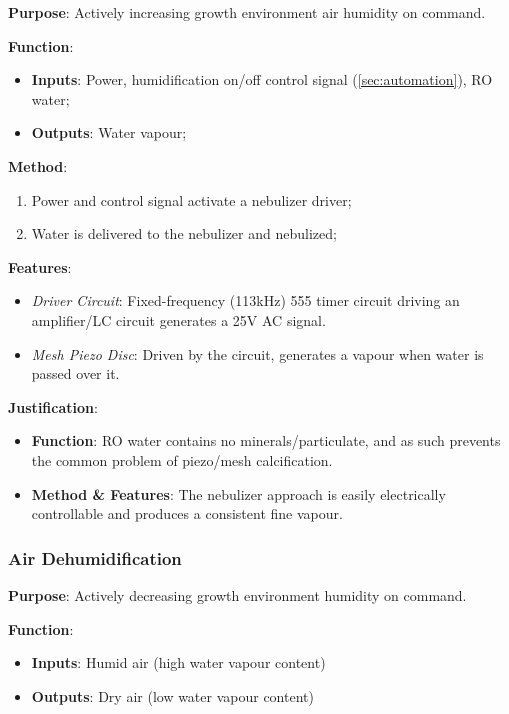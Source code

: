 \documentclass{report}
\begin{document}
\textbf{Purpose}: Actively increasing growth environment air humidity on command.

\textbf{Function}:
\begin{itemize}
    \item \textbf{Inputs}: Power, humidification on/off control signal (\ref{sec:automation}), RO water;
    \item \textbf{Outputs}: Water vapour;
\end{itemize}

\textbf{Method}:
\begin{enumerate}
    \item Power and control signal activate a nebulizer driver;
    \item Water is delivered to the nebulizer and nebulized;
\end{enumerate}

\textbf{Features}:
\begin{itemize}
    \item \textit{Driver Circuit}: Fixed-frequency (113kHz) 555 timer circuit driving an amplifier/LC circuit generates a 25V AC signal. %
    \item \textit{Mesh Piezo Disc}: Driven by the circuit, generates a vapour when water is passed over it.
\end{itemize}

\textbf{Justification}:
\begin{itemize}
    \item \textbf{Function}: RO water contains no minerals/particulate, and as such prevents the common problem of piezo/mesh calcification.
    \item \textbf{Method \& Features}: The nebulizer approach is easily electrically controllable and produces a consistent fine vapour. 
\end{itemize}

\newpage

\subsubsection{Air Dehumidification}
\label{sec:dehum}

\textbf{Purpose}: Actively decreasing growth environment humidity on command.

\textbf{Function}:
\begin{itemize}
    \item \textbf{Inputs}: Humid air (high water vapour content)
    \item \textbf{Outputs}: Dry air (low water vapour content)
\end{itemize}
\end{document}
